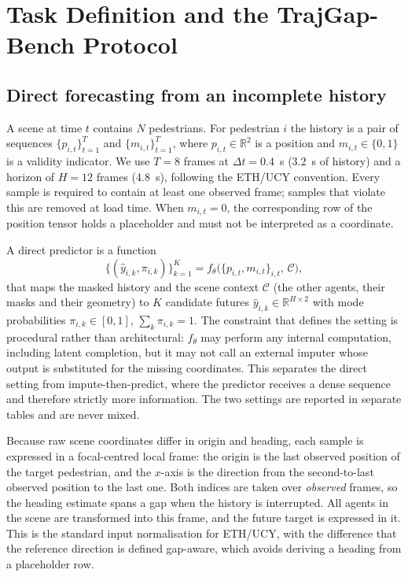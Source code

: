 \section{Task Definition and the TrajGap-Bench Protocol}
\label{sec:bench}

\subsection{Direct forecasting from an incomplete history}
\label{sec:task}

A scene at time $t$ contains $N$ pedestrians. For pedestrian $i$ the history is a pair of sequences $\{p_{i,t}\}_{t=1}^{T}$ and $\{m_{i,t}\}_{t=1}^{T}$, where $p_{i,t}\in\mathbb{R}^{2}$ is a position and $m_{i,t}\in\{0,1\}$ is a validity indicator. We use $T=8$ frames at $\Delta t=0.4$~s (3.2~s of history) and a horizon of $H=12$ frames (4.8~s), following the ETH/UCY convention. Every sample is required to contain at least one observed frame; samples that violate this are removed at load time. When $m_{i,t}=0$, the corresponding row of the position tensor holds a placeholder and must not be interpreted as a coordinate.

A direct predictor is a function
\begin{equation}
\{(\hat{y}_{i,k},\pi_{i,k})\}_{k=1}^{K}=f_{\theta}\big(\{p_{i,t},m_{i,t}\}_{i,t},\,\mathcal{C}\big),
\label{eq:task}
\end{equation}
that maps the masked history and the scene context $\mathcal{C}$ (the other agents, their masks and their geometry) to $K$ candidate futures $\hat{y}_{i,k}\in\mathbb{R}^{H\times 2}$ with mode probabilities $\pi_{i,k}\in[0,1]$, $\sum_{k}\pi_{i,k}=1$. The constraint that defines the setting is procedural rather than architectural: $f_{\theta}$ may perform any internal computation, including latent completion, but it may not call an external imputer whose output is substituted for the missing coordinates. This separates the direct setting from impute-then-predict, where the predictor receives a dense sequence and therefore strictly more information. The two settings are reported in separate tables and are never mixed.

Because raw scene coordinates differ in origin and heading, each sample is expressed in a focal-centred local frame: the origin is the last observed position of the target pedestrian, and the $x$-axis is the direction from the second-to-last observed position to the last one. Both indices are taken over \emph{observed} frames, so the heading estimate spans a gap when the history is interrupted. All agents in the scene are transformed into this frame, and the future target is expressed in it. This is the standard input normalisation for ETH/UCY, with the difference that the reference direction is defined gap-aware, which avoids deriving a heading from a placeholder row.


